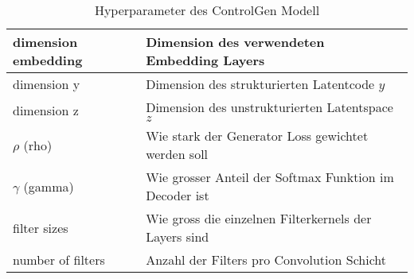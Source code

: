 \begin{table}[ht]
\begin{tabular}{| l | l |}
	dimension embedding     & Dimension des verwendeten Embedding Layers                  \\ \hline
	dimension y             & Dimension des strukturierten Latentcode $y$                 \\ \hline
	dimension z             & Dimension des unstrukturierten Latentspace $z$              \\ \hline
	$\rho$ (rho)            & Wie stark der Generator Loss gewichtet werden soll          \\ \hline        
	$\gamma$ (gamma)        & Wie grosser Anteil der Softmax Funktion im Decoder ist      \\ \hline
	filter sizes            & Wie gross die einzelnen Filterkernels der Layers sind       \\ \hline
	number of filters       & Anzahl der Filters pro Convolution Schicht                  \\ \hline             
	\end{tabular}
	\caption{Hyperparameter des ControlGen Modell}
	\label{tab:hyperparameter_control_gen}
\end{table}

